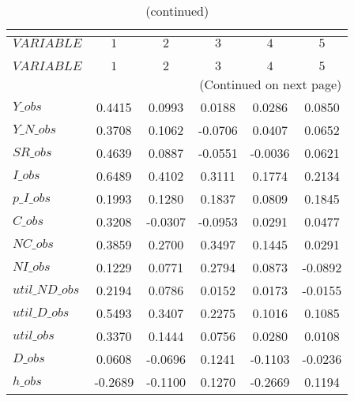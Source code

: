  
\begin{center}
\begin{longtable}{lccccc} 
\caption{AUTOCORRELATION OF SIMULATED VARIABLES}\\
 \label{Table:sim_autocorr_matrix}\\
\toprule 
$VARIABLE       $	 & 	 $          1$	 & 	 $          2$	 & 	 $          3$	 & 	 $          4$	 & 	 $          5$\\
\midrule \endfirsthead 
\caption{(continued)}\\
 \toprule \\ 
$VARIABLE       $	 & 	 $          1$	 & 	 $          2$	 & 	 $          3$	 & 	 $          4$	 & 	 $          5$\\
\midrule \endhead 
\midrule \multicolumn{6}{r}{(Continued on next page)} \\ \bottomrule \endfoot 
\bottomrule \endlastfoot 
$Y\_obs         $	 & 	     0.4415	 & 	     0.0993	 & 	     0.0188	 & 	     0.0286	 & 	     0.0850 \\ 
$Y\_N\_obs      $	 & 	     0.3708	 & 	     0.1062	 & 	    -0.0706	 & 	     0.0407	 & 	     0.0652 \\ 
$SR\_obs        $	 & 	     0.4639	 & 	     0.0887	 & 	    -0.0551	 & 	    -0.0036	 & 	     0.0621 \\ 
$I\_obs         $	 & 	     0.6489	 & 	     0.4102	 & 	     0.3111	 & 	     0.1774	 & 	     0.2134 \\ 
$p\_I\_obs      $	 & 	     0.1993	 & 	     0.1280	 & 	     0.1837	 & 	     0.0809	 & 	     0.1845 \\ 
$C\_obs         $	 & 	     0.3208	 & 	    -0.0307	 & 	    -0.0953	 & 	     0.0291	 & 	     0.0477 \\ 
$NC\_obs        $	 & 	     0.3859	 & 	     0.2700	 & 	     0.3497	 & 	     0.1445	 & 	     0.0291 \\ 
$NI\_obs        $	 & 	     0.1229	 & 	     0.0771	 & 	     0.2794	 & 	     0.0873	 & 	    -0.0892 \\ 
$util\_ND\_obs  $	 & 	     0.2194	 & 	     0.0786	 & 	     0.0152	 & 	     0.0173	 & 	    -0.0155 \\ 
$util\_D\_obs   $	 & 	     0.5493	 & 	     0.3407	 & 	     0.2275	 & 	     0.1016	 & 	     0.1085 \\ 
$util\_obs      $	 & 	     0.3370	 & 	     0.1444	 & 	     0.0756	 & 	     0.0280	 & 	     0.0108 \\ 
$D\_obs         $	 & 	     0.0608	 & 	    -0.0696	 & 	     0.1241	 & 	    -0.1103	 & 	    -0.0236 \\ 
$h\_obs         $	 & 	    -0.2689	 & 	    -0.1100	 & 	     0.1270	 & 	    -0.2669	 & 	     0.1194 \\ 
\end{longtable}
 \end{center}
